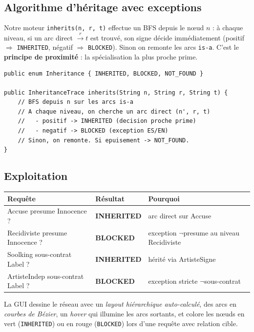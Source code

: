 \documentclass[11pt, a4paper]{article}
\newcommand{\code}[1]{\texttt{#1}}
\begin{document}
\subsection*{Algorithme d'héritage avec exceptions}

Notre moteur \code{inherits(n, r, t)} effectue un BFS depuis le nœud $n$ : à
chaque niveau, si un arc direct $\xrightarrow{r} t$ est trouvé, son signe
décide immédiatement (positif $\Rightarrow$ \code{INHERITED}, négatif
$\Rightarrow$ \code{BLOCKED}). Sinon on remonte les arcs \code{is-a}. C'est
le \textbf{principe de proximité} : la spécialisation la plus proche prime.

\begin{lstlisting}[caption={Moteur d'héritage (extrait)}]
public enum Inheritance { INHERITED, BLOCKED, NOT_FOUND }

public InheritanceTrace inherits(String n, String r, String t) {
    // BFS depuis n sur les arcs is-a
    // A chaque niveau, on cherche un arc direct (n', r, t)
    //   - positif -> INHERITED (decision proche prime)
    //   - negatif -> BLOCKED (exception ES/EN)
    // Sinon, on remonte. Si epuisement -> NOT_FOUND.
}
\end{lstlisting}

\subsection*{Exploitation}

\begin{center}\small
\begin{tabular}{lll}
\toprule
\textbf{Requête} & \textbf{Résultat} & \textbf{Pourquoi} \\
\midrule
Accuse presume Innocence ?      & \textbf{INHERITED} & arc direct sur Accuse \\
Recidiviste presume Innocence ? & \textbf{BLOCKED}   & exception $\lnot$presume au niveau Recidiviste \\
Soolking sous-contrat Label ?   & \textbf{INHERITED} & hérité via ArtisteSigne \\
ArtisteIndep sous-contrat Label ? & \textbf{BLOCKED} & exception stricte $\lnot$sous-contrat \\
\bottomrule
\end{tabular}
\end{center}

\noindent La GUI dessine le réseau avec un \emph{layout hiérarchique
auto-calculé}, des arcs en \emph{courbes de Bézier}, un \emph{hover} qui
illumine les arcs sortants, et colore les nœuds en vert (\code{INHERITED}) ou
en rouge (\code{BLOCKED}) lors d'une requête avec relation cible.
\end{document}

